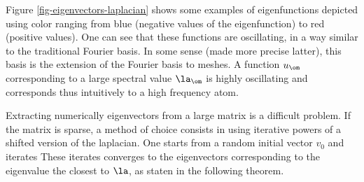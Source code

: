    

Figure \ref{fig-eigenvectors-laplacian} shows some examples of eigenfunctions depicted using color ranging from blue (negative values of the eigenfunction) to red (positive values). One can see that these functions are oscillating, in a way similar to the traditional Fourier basis. In some sense (made more precise latter), this basis is the extension of the Fourier basis to meshes. A function $u_\om$ corresponding to a large spectral value $\la_\om$ is highly oscillating and corresponds thus intuitively to a high frequency atom.

Extracting numerically eigenvectors from a large matrix is a difficult problem. If the matrix is sparse, a method of choice consists in using iterative powers of a shifted version of the laplacian. One starts from a random initial vector $v_0$ and iterates
These iterates converges to the eigenvectors corresponding to the eigenvalue the closest to $\la$, as staten in the following theorem.

